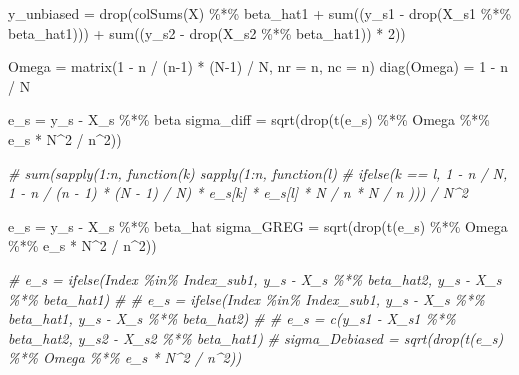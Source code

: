 \documentclass[
]{article}
\newenvironment{Shaded}{\begin{snugshade}}{\end{snugshade}}
\newcommand{\AttributeTok}[1]{\textcolor[rgb]{0.77,0.63,0.00}{#1}}
\newcommand{\CommentTok}[1]{\textcolor[rgb]{0.56,0.35,0.01}{\textit{#1}}}
\newcommand{\DecValTok}[1]{\textcolor[rgb]{0.00,0.00,0.81}{#1}}
\newcommand{\FunctionTok}[1]{\textcolor[rgb]{0.00,0.00,0.00}{#1}}
\newcommand{\NormalTok}[1]{#1}
\newcommand{\OtherTok}[1]{\textcolor[rgb]{0.56,0.35,0.01}{#1}}
\newcommand{\SpecialCharTok}[1]{\textcolor[rgb]{0.00,0.00,0.00}{#1}}
\begin{document}
\begin{Shaded}
\begin{Highlighting}[]
\NormalTok{y\_unbiased }\OtherTok{=} \FunctionTok{drop}\NormalTok{(}\FunctionTok{colSums}\NormalTok{(X) }\SpecialCharTok{\%*\%}\NormalTok{ beta\_hat1 }\SpecialCharTok{+} \FunctionTok{sum}\NormalTok{((y\_s1 }\SpecialCharTok{{-}} \FunctionTok{drop}\NormalTok{(X\_s1 }\SpecialCharTok{\%*\%}\NormalTok{ beta\_hat1))) }
                  \SpecialCharTok{+} \FunctionTok{sum}\NormalTok{((y\_s2 }\SpecialCharTok{{-}} \FunctionTok{drop}\NormalTok{(X\_s2 }\SpecialCharTok{\%*\%}\NormalTok{ beta\_hat1)) }\SpecialCharTok{*} \DecValTok{2}\NormalTok{))}

\NormalTok{Omega }\OtherTok{=} \FunctionTok{matrix}\NormalTok{(}\DecValTok{1} \SpecialCharTok{{-}}\NormalTok{ n }\SpecialCharTok{/}\NormalTok{ (n}\DecValTok{{-}1}\NormalTok{) }\SpecialCharTok{*}\NormalTok{ (N}\DecValTok{{-}1}\NormalTok{) }\SpecialCharTok{/}\NormalTok{ N, }\AttributeTok{nr =}\NormalTok{ n, }\AttributeTok{nc =}\NormalTok{ n)}
\FunctionTok{diag}\NormalTok{(Omega) }\OtherTok{=} \DecValTok{1} \SpecialCharTok{{-}}\NormalTok{ n }\SpecialCharTok{/}\NormalTok{ N}


\NormalTok{e\_s }\OtherTok{=}\NormalTok{ y\_s }\SpecialCharTok{{-}}\NormalTok{ X\_s }\SpecialCharTok{\%*\%}\NormalTok{ beta}
\NormalTok{sigma\_diff }\OtherTok{=} \FunctionTok{sqrt}\NormalTok{(}\FunctionTok{drop}\NormalTok{(}\FunctionTok{t}\NormalTok{(e\_s)  }\SpecialCharTok{\%*\%}\NormalTok{ Omega }\SpecialCharTok{\%*\%}\NormalTok{ e\_s }\SpecialCharTok{*}\NormalTok{ N}\SpecialCharTok{\^{}}\DecValTok{2} \SpecialCharTok{/}\NormalTok{ n}\SpecialCharTok{\^{}}\DecValTok{2}\NormalTok{))}

\CommentTok{\# sum(sapply(1:n, function(k) sapply(1:n, function(l) }
\CommentTok{\#   ifelse(k == l, 1 {-} n / N, 1 {-} n / (n {-} 1) * (N {-} 1) / N) * e\_s[k] * e\_s[l] * N / n * N / n  ))) / N\^{}2}

\NormalTok{e\_s }\OtherTok{=}\NormalTok{ y\_s }\SpecialCharTok{{-}}\NormalTok{ X\_s }\SpecialCharTok{\%*\%}\NormalTok{ beta\_hat}
\NormalTok{sigma\_GREG }\OtherTok{=} \FunctionTok{sqrt}\NormalTok{(}\FunctionTok{drop}\NormalTok{(}\FunctionTok{t}\NormalTok{(e\_s)  }\SpecialCharTok{\%*\%}\NormalTok{ Omega }\SpecialCharTok{\%*\%}\NormalTok{ e\_s }\SpecialCharTok{*}\NormalTok{ N}\SpecialCharTok{\^{}}\DecValTok{2} \SpecialCharTok{/}\NormalTok{ n}\SpecialCharTok{\^{}}\DecValTok{2}\NormalTok{))}

\CommentTok{\# e\_s = ifelse(Index \%in\% Index\_sub1, y\_s {-} X\_s \%*\% beta\_hat2, y\_s {-} X\_s \%*\% beta\_hat1)}
\CommentTok{\# \# e\_s = ifelse(Index \%in\% Index\_sub1, y\_s {-} X\_s \%*\% beta\_hat1, y\_s {-} X\_s \%*\% beta\_hat2)}
\CommentTok{\# \# e\_s = c(y\_s1 {-} X\_s1 \%*\% beta\_hat2, y\_s2 {-} X\_s2 \%*\% beta\_hat1)}
\CommentTok{\# sigma\_Debiased = sqrt(drop(t(e\_s)  \%*\% Omega \%*\% e\_s * N\^{}2 / n\^{}2))}


\end{Highlighting}
\end{Shaded}
\end{document}
